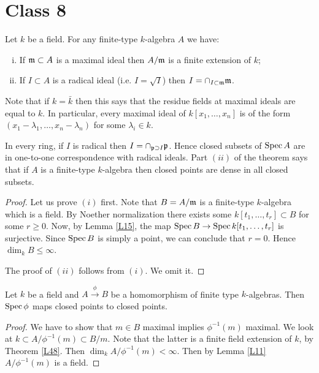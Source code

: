 \documentclass{../mathnotes}
\begin{document}
\section*{Class 8}

\begin{thm}
\label{L48}
Let $k$ be a field. For any finite-type $k$-algebra $A$ we have:
\begin{enumerate}[(i)]
\item If $\mathfrak m\subset A$ is a maximal ideal then $A/\mathfrak m$ is a finite extension of $k$;
\item If $I\subset A$ is a radical ideal (i.e. $I=\sqrt{I}$) then $I=\cap_{I\subset\mathfrak m}\mathfrak m$.
\end{enumerate}
\end{thm}

\begin{rem}
Note that if $k=\bar k$ then this says that the residue fields at maximal ideals are equal to $k$. In particular, every maximal ideal of $k[x_1,\ldots,x_n]$ is of the form $(x_1-\lambda_1,\ldots,x_n-\lambda_n)$ for some $\lambda_i\in k$.

In every ring, if $I$ is radical then $I=\cap_{\mathfrak p\supset I}\mathfrak p$. Hence closed subsets of $\operatorname{Spec} A$ are in one-to-one correspondence with radical ideals. Part $(ii)$ of the theorem says that if $A$ is a finite-type $k$-algebra then closed points are dense in all closed subsets.
\end{rem}

\begin{proof}
Let us prove $(i)$ first. Note that $B=A/\mathfrak m$ is a finite-type $k$-algebra which is a field. By Noether normalization there exists some $k[t_1,\ldots,t_r]\subset B$ for some $r\geq 0$. Now, by Lemma \ref{L15}, the map $\operatorname{Spec} B\to\operatorname{Spec} k[t_1,\ldots, t_r]$ is surjective. Since $\operatorname{Spec} B$ is simply a point, we can conclude that $r=0$. Hence $\dim_k B\leq\infty$.

The proof of $(ii)$ follows from $(i)$. We omit it.
\end{proof}

\begin{lem}
\label{L49}
Let $k$ be a field and $A \overset{\phi}{\to} B$ be a homomorphism of finite type $k$-algebras. Then $\operatorname{Spec} \phi$ maps closed points to closed points.
\end{lem}

\begin{proof}
We have to show that $m\in B$ maximal implies $\phi^{-1}(m)$ maximal. We look at $k \subset A/\phi^{-1}(m) \subset B/m$. Note that the latter is a finite field extension of $k$, by Theorem \ref{L48}. Then $\dim_k A/\phi^{-1}(m) < \infty$. Then by Lemma \ref{L11} $A/\phi^{-1}(m)$ is a field. 
\end{proof}
\end{document}
